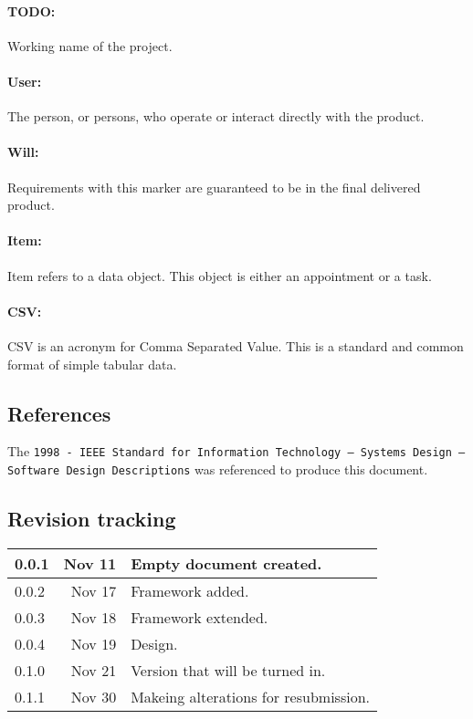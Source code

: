 \documentclass[12pt]{article}
\begin{document}
\paragraph{TODO:} Working name of the project.
\paragraph{User:} The person, or persons, who operate or interact directly with the product.
\paragraph{Will:} Requirements with this marker are guaranteed to be in the final delivered product.
\paragraph{Item:} Item refers to a data object. This object is either an appointment or a task.
\paragraph{CSV:} CSV is an acronym for Comma Separated Value. This is a standard and common format of simple tabular data.

\subsection{References}
The {\tt 1998 - IEEE Standard for Information Technology -- Systems Design -- Software Design Descriptions} was referenced to produce this document.

\subsection{Revision tracking}
\begin{tabular}{|l|r|p{4.6in}|}
\hline
0.0.1 & Nov 11 & Empty document created.\\
\hline
0.0.2 & Nov 17 & Framework added.\\
\hline
0.0.3 & Nov 18 & Framework extended.\\
\hline
0.0.4 & Nov 19 & Design.\\
\hline
0.1.0 & Nov 21 & Version that will be turned in.\\
\hline
0.1.1 & Nov 30 & Makeing alterations for resubmission.\\
\hline
\end{tabular}

\end{document}
